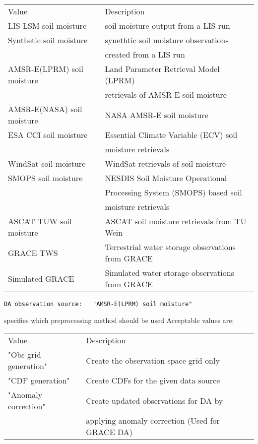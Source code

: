  \begin{tabular}{ll}
 Value                      & Description                           \\
 LIS LSM soil moisture      & soil moisture output from a LIS run   \\
 Synthetic soil moisture    & synethtic soil moisture observations  \\
                            & created from a LIS run                \\
 AMSR-E(LPRM) soil moisture & Land Parameter Retrieval Model (LPRM) \\
                            & retrievals of AMSR-E soil moisture    \\
 AMSR-E(NASA) soil moisture & NASA AMSR-E soil moisture             \\
 ESA CCI soil moisture      & Essential Climate Variable (ECV) soil \\
                            & moisture retrievals                   \\
 WindSat soil moisture      & WindSat retrievals of soil moisture   \\
 SMOPS soil moisture        & NESDIS Soil Moisture Operational   \\
                            & Processing System (SMOPS) based soil  \\
                            & moisture retrievals                   \\
 ASCAT TUW soil moisture    & ASCAT soil moisture retrievals from
                              TU Wein                               \\
 GRACE TWS                  & Terrestrial water storage observations
                              from GRACE                            \\ 
 Simulated GRACE            & Simulated water storage observations
                              from GRACE                            \\ 
 \end{tabular} 
 

 \begin{Verbatim}[frame=single]
DA observation source:   "AMSR-E(LPRM) soil moisture"
 \end{Verbatim}

 
 specifies which preprocessing method should be used
 Acceptable values are:

 \begin{tabular}{ll}
 Value     & Description                                  \\
 "Obs grid generation"  & Create the observation space grid only \\
 "CDF generation"       & Create CDFs for the given data source \\
 "Anomaly correction"   & Create updated observations for DA by \\
                        & applying anomaly correction (Used for GRACE DA)\\
 \end{tabular}

